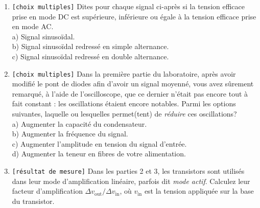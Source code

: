 \documentclass[canadien,12pt,oneside,letterpaper]{article}
\begin{document}
\begin{enumerate}
\item \texttt{[choix multiples]} Dites pour chaque signal ci-après si la tension efficace prise en mode DC est supérieure, inférieure ou égale à la tension efficace prise en mode AC.\\a) Signal sinusoïdal.\\b) Signal sinusoïdal redressé en simple alternance.\\c) Signal sinusoïdal redressé en double alternance.
\item \texttt{[choix multiples]} Dans la première partie du laboratoire, après avoir modifié le pont de diodes afin d'avoir un signal moyenné, vous avez sûrement remarqué, à l'aide de l'oscilloscope, que ce dernier n'était pas encore tout à fait constant : les oscillations étaient encore notables. Parmi les options suivantes, laquelle ou lesquelles permet(tent) de \textit{réduire} ces oscillations?\\a) Augmenter la capacité du condensateur.\\b) Augmenter la fréquence du signal.\\ c) Augmenter l'amplitude en tension du signal d'entrée.\\ d) Augmenter la teneur en fibres de votre alimentation.
\item \texttt{[résultat de mesure]} Dans les parties 2 et 3, les transistors sont utilisés dans leur mode d'amplification linéaire, parfois dit \textit{mode actif}. Calculez leur facteur d'amplification $\Delta v_{\mathrm{out}}/\Delta v_{\mathrm{in}}$, où $v_{\mathrm{in}}$ est la tension appliquée sur la base du transistor.
\end{enumerate}
\end{document}
